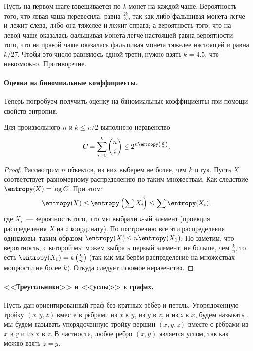 Пусть на первом шаге взвешивается по $k$ монет на каждой чаше. Вероятность того, что левая чаша
перевесила, равна $\frac{2k}{27}$, так как либо фальшивая монета легче и лежит слева, либо она тяжелее и
лежит справа; а вероятность того, что на левой чаше оказалась фальшивая монета легче настоящей равна
вероятности того, что на правой чаше оказалась фальшивая монета тяжелее настоящей и равна $k / 27$. Чтобы
это число равнялось одной трети, нужно взять $k = 4.5$, что невозможно. Противоречие.


\paragraph{Оценка на биномиальные коэффициенты.}
Теперь попробуем получить оценку на биномиальные коэффициенты при помощи свойств энтропии.

\begin{proposition}
    \label{prop:binomial-coef}
	Для произвольного $n$ и $k \le n / 2$ выполнено неравенство
    $$
        C = \sum_{i = 0}^k \binom{n}{i} \le 2^{n \entropy\left(\frac{k}{n}\right)}.
    $$
\end{proposition}

\begin{proof}
    Рассмотрим $n$ объектов, из них выберем не более, чем $k$ штук. Пусть $X$ соответствует равномерному
    распределению по таким множествам. Как следствие $\entropy(X) = \log C$. При этом:
    $$
        \entropy(X) \le \entropy\left(\sum X_i\right) \le \sum \entropy(X_i),
    $$
    где $X_i$~--- вероятность того, что мы выбрали $i$-ый элемент (проекция распределения $X$ на $i$
    координату). По построению все эти распределения одинаковы, таким образом $\entropy(X) \le
    n\entropy(X_1)$. Но заметим, что вероятность, с которой мы можем выбрать первый элемент, не больше,
    чем $\frac{k}{n}$, то есть $\entropy(X_1) = h\left(\frac{k}{n}\right)$ (так как мы берём
    распределение на множествах мощности не более $k$). Откуда следует искомое неравенство.
\end{proof}


\paragraph{<<Треугольники>> и <<углы>> в графах.}
Пусть дан ориентированный граф без кратных рёбер и петель. Упорядоченную тройку $(x, y, z)$ вместе в
рёбрами из $x$ в $y$, из $y$ в $z$, и из $z$ в $x$, будем называть
.  мы будем называть упорядоченную тройку вершин $(x, y, z)$ вместе
с рёбрами из $x$ в $y$ и из $x$ в $z$. В частности, любое ребро $(x, y)$ является углом, так как можно
взять $z = y$.

